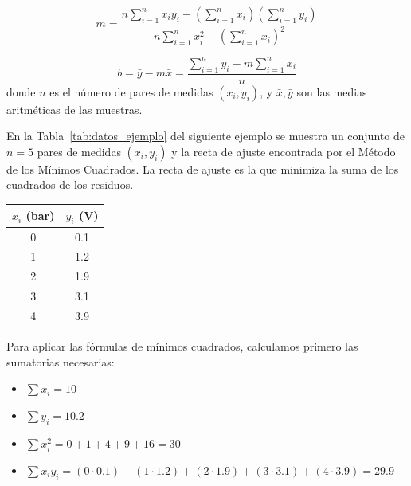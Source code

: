 \begin{equation} \label{eq:m_final}
    m = \frac{n \sum\limits_{i=1}^n x_i y_i - \left(\sum\limits_{i=1}^n x_i\right) \left(\sum\limits_{i=1}^n y_i\right)}{n \sum\limits_{i=1}^n x_i^2 - {\left(\sum\limits_{i=1}^n x_i\right)}^2}
\end{equation}

\begin{equation} \label{eq:b_final}
    b = \bar{y} - m\bar{x} = \frac{\sum\limits_{i=1}^n y_i - m \sum\limits_{i=1}^n x_i}{n}
\end{equation}
donde $n$ es el número de pares de medidas $(x_i, y_i)$, y $\bar{x}, \bar{y}$ son las medias aritméticas de las muestras. 


En la Tabla~\ref{tab:datos_ejemplo} del siguiente ejemplo se muestra un conjunto de $n=5$ pares de medidas $(x_i, y_i)$ y la recta de ajuste encontrada por el Método de los Mínimos Cuadrados. La recta de ajuste es la que minimiza la suma de los cuadrados de los residuos.

\begin{margintable}
    \centering
    \caption[Datos experimentales del sensor.]{Datos experimentales del sensor. Se muestra un conjunto de $n=5$ pares de medidas $(x_i, y_i)$ y la recta de ajuste encontrada por el Método de los Mínimos Cuadrados.\protect\label{tab:datos_ejemplo}}
    \begin{tabular}{c c}
        \toprule
        $x_i$ (bar) & $y_i$ (V) \\
        \midrule
        0 & 0.1 \\
        1 & 1.2 \\
        2 & 1.9 \\
        3 & 3.1 \\
        4 & 3.9 \\
        \bottomrule
    \end{tabular}
\end{margintable}

Para aplicar las fórmulas de mínimos cuadrados, calculamos primero las sumatorias necesarias:
\begin{itemize}
    \item $\sum x_i = 10$
    \item $\sum y_i = 10.2$
    \item $\sum x_i^2 = 0 + 1 + 4 + 9 + 16 = 30$
    \item $\sum x_i y_i = (0\cdot 0.1) + (1\cdot 1.2) + (2\cdot 1.9) + (3\cdot 3.1) + (4\cdot 3.9) = 29.9$
\end{itemize}

